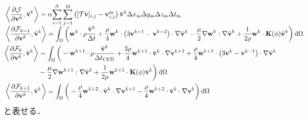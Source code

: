 \documentclass[a4paper,xelatex,ja=standard]{bxjsarticle}
\begin{document}
\begin{align}
    &\left\langle\frac{\partial \mathcal{J}}{\partial \mathbf{v}^k}, \tilde{\mathbf{v}}^k\right\rangle
    = \alpha \smash{\sum_{i=1}^{N} \sum_{j=1}^{M}} \left([\mathcal{T}\mathbf{v}]_{i, j}-\mathbf{v}_{i,j}^{\text{m}}\right)\tilde{\mathbf{v}}^{k} \Delta x_{\text{m}} \Delta y_{\text{m}} \Delta z_{\text{m}} \Delta t_{\text{m}} \\
    &\left\langle\frac{\partial \mathcal{F}_{k-1}}{\partial \mathbf{v}^k}, \tilde{\mathbf{v}}^k\right\rangle
    = \int_{\Omega} \bigg( \mathbf{w}^{k} \cdot \rho\frac{\tilde{\mathbf{v}}^k}{\Delta t} + \frac{\rho}{4} \mathbf{w}^{k} \cdot \left( 3\mathbf{v}^{k-1} - \mathbf{v}^{k-2} \right) \cdot \nabla \tilde{\mathbf{v}}^{k} 
    - \frac{\mu}{2} \nabla \mathbf{w}^{k}: \nabla \tilde{\mathbf{v}}^k + \frac{1}{2\rho} \mathbf{w}^{k} \cdot \mathbf{K}(\phi) \tilde{\mathbf{v}}^k \bigg) \, \mathrm{d}\Omega \\
    &\begin{aligned}
        \left\langle\frac{\partial \mathcal{F}_k}{\partial \mathbf{v}^k}, \tilde{\mathbf{v}}^k\right\rangle
        &= \int_{\Omega} \bigg( -\mathbf{w}^{k+1} \cdot \rho \frac{\tilde{\mathbf{v}}^k}{\Delta t_{\text{CFD}}} + \frac{3\rho}{4} \mathbf{w}^{k+1} \cdot \tilde{\mathbf{v}}^k \cdot \nabla \mathbf{v}^{k+1} + \frac{\rho}{4} \mathbf{w}^{k+1} \cdot \left( 3\mathbf{v}^k - \mathbf{v}^{k-1} \right) \cdot \nabla \tilde{\mathbf{v}}^{k} \\
        &- \frac{\mu}{2} \nabla \mathbf{w}^{k+1}: \nabla \tilde{\mathbf{v}}^k + \frac{1}{2\rho} \mathbf{w}^{k+1} \cdot \mathbf{K}(\phi) \tilde{\mathbf{v}}^k \bigg) \, \mathrm{d}\Omega
    \end{aligned} \\
    &\left\langle\frac{\partial \mathcal{F}_{k+1}}{\partial \mathbf{v}^k}, \tilde{\mathbf{v}}^k\right\rangle
    = \int_{\Omega} \bigg( - \frac{\rho}{4}\mathbf{w}^{k+2} \cdot \tilde{\mathbf{v}}^{k} \cdot \nabla \mathbf{v}^{k+1} 
    - \frac{\rho}{4} \mathbf{w}^{k+2} \cdot \tilde{\mathbf{v}}^{k} \cdot \nabla \mathbf{v}^{k}\bigg) \, \mathrm{d}\Omega 
\end{align}
と表せる．
\end{document}
